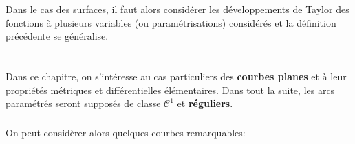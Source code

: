Dans le cas des surfaces, il faut alors considérer les développements de Taylor des fonctions à plusieurs variables (ou paramétrisations) considérés et la définition précédente se généralise.
\chapter*{} %

Dans ce chapitre, on s'intéresse au cas particuliers des \textbf{courbes planes} et à leur propriétés métriques et différentielles élémentaires. Dans tout la suite, les arcs paramétrés seront supposés de classe \(\mathcal{C}^1\) et \textbf{réguliers}.

\subsection*{}
On peut considèrer alors quelques courbes remarquables:
